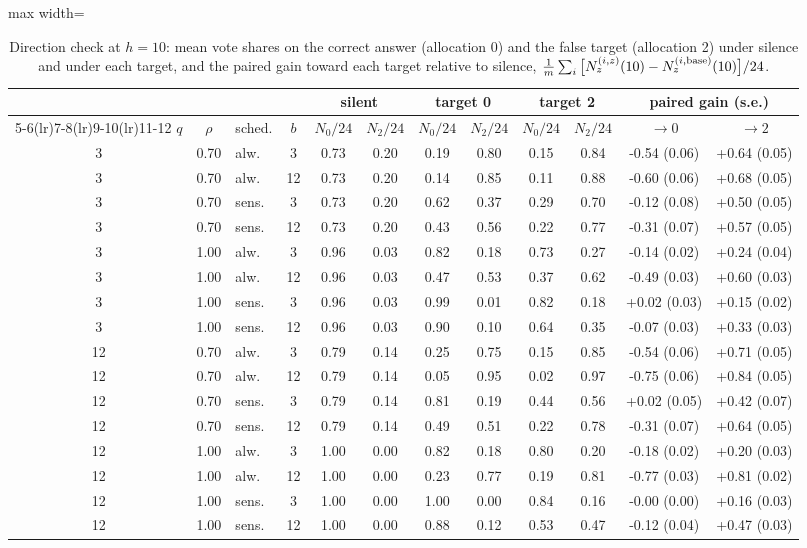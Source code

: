 \documentclass[10pt]{article}
\begin{document}
\begin{table}[htbp]
\centering
\scriptsize
\caption{Direction check at $h=10$: mean vote shares on the correct answer (allocation 0) and the false target (allocation 2) under silence and under each target, and the paired gain toward each target relative to silence, $\frac1m\sum_i\big[N_z^{(i,z)}(10)-N_z^{(i,\rm base)}(10)\big]/24$.}\label{tab:direction}
\begin{adjustbox}{max width=\textwidth}
\begin{tabular}{cclc cc cc cc cc}
\toprule
\multicolumn{4}{c}{} & \multicolumn{2}{c}{silent} & \multicolumn{2}{c}{target 0} & \multicolumn{2}{c}{target 2} & \multicolumn{2}{c}{paired gain (s.e.)} \\ \cmidrule(lr){5-6}\cmidrule(lr){7-8}\cmidrule(lr){9-10}\cmidrule(lr){11-12}
$q$ & $\rho$ & sched. & $b$ & $N_0/24$ & $N_2/24$ & $N_0/24$ & $N_2/24$ & $N_0/24$ & $N_2/24$ & $\to 0$ & $\to 2$ \\
\midrule
3 & 0.70 & alw. & 3 & 0.73 & 0.20 & 0.19 & 0.80 & 0.15 & 0.84 & -0.54 (0.06) & +0.64 (0.05) \\
3 & 0.70 & alw. & 12 & 0.73 & 0.20 & 0.14 & 0.85 & 0.11 & 0.88 & -0.60 (0.06) & +0.68 (0.05) \\
3 & 0.70 & sens. & 3 & 0.73 & 0.20 & 0.62 & 0.37 & 0.29 & 0.70 & -0.12 (0.08) & +0.50 (0.05) \\
3 & 0.70 & sens. & 12 & 0.73 & 0.20 & 0.43 & 0.56 & 0.22 & 0.77 & -0.31 (0.07) & +0.57 (0.05) \\
3 & 1.00 & alw. & 3 & 0.96 & 0.03 & 0.82 & 0.18 & 0.73 & 0.27 & -0.14 (0.02) & +0.24 (0.04) \\
3 & 1.00 & alw. & 12 & 0.96 & 0.03 & 0.47 & 0.53 & 0.37 & 0.62 & -0.49 (0.03) & +0.60 (0.03) \\
3 & 1.00 & sens. & 3 & 0.96 & 0.03 & 0.99 & 0.01 & 0.82 & 0.18 & +0.02 (0.03) & +0.15 (0.02) \\
3 & 1.00 & sens. & 12 & 0.96 & 0.03 & 0.90 & 0.10 & 0.64 & 0.35 & -0.07 (0.03) & +0.33 (0.03) \\
12 & 0.70 & alw. & 3 & 0.79 & 0.14 & 0.25 & 0.75 & 0.15 & 0.85 & -0.54 (0.06) & +0.71 (0.05) \\
12 & 0.70 & alw. & 12 & 0.79 & 0.14 & 0.05 & 0.95 & 0.02 & 0.97 & -0.75 (0.06) & +0.84 (0.05) \\
12 & 0.70 & sens. & 3 & 0.79 & 0.14 & 0.81 & 0.19 & 0.44 & 0.56 & +0.02 (0.05) & +0.42 (0.07) \\
12 & 0.70 & sens. & 12 & 0.79 & 0.14 & 0.49 & 0.51 & 0.22 & 0.78 & -0.31 (0.07) & +0.64 (0.05) \\
12 & 1.00 & alw. & 3 & 1.00 & 0.00 & 0.82 & 0.18 & 0.80 & 0.20 & -0.18 (0.02) & +0.20 (0.03) \\
12 & 1.00 & alw. & 12 & 1.00 & 0.00 & 0.23 & 0.77 & 0.19 & 0.81 & -0.77 (0.03) & +0.81 (0.02) \\
12 & 1.00 & sens. & 3 & 1.00 & 0.00 & 1.00 & 0.00 & 0.84 & 0.16 & -0.00 (0.00) & +0.16 (0.03) \\
12 & 1.00 & sens. & 12 & 1.00 & 0.00 & 0.88 & 0.12 & 0.53 & 0.47 & -0.12 (0.04) & +0.47 (0.03) \\
\bottomrule
\end{tabular}
\end{adjustbox}
\end{table}
\end{document}
